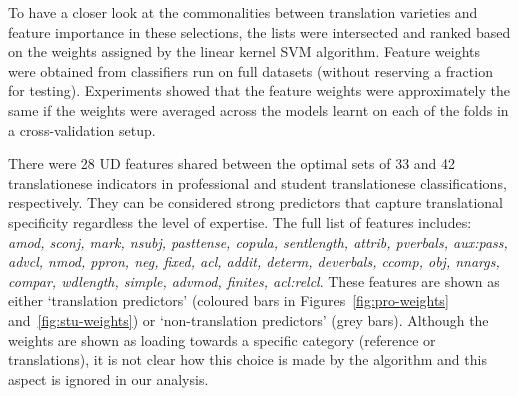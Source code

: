 To have a closer look at the commonalities between translation varieties and feature importance in these selections, the lists were intersected and ranked based on the weights assigned by the linear kernel SVM algorithm. Feature weights were obtained from classifiers run on full datasets (without reserving a fraction for testing). Experiments showed that the feature weights were approximately the same if the weights were averaged across the models learnt on each of the folds in a cross-validation setup.

There were 28 UD features shared between the optimal sets of 33 and 42 translationese indicators in professional and student translationese classifications, respectively. They can be considered strong predictors that capture translational specificity regardless the level of expertise.
The full list of features includes: \textit{amod, sconj, mark, nsubj, pasttense, copula, sentlength, attrib, pverbals, aux:pass, advcl, nmod, ppron, neg, fixed, acl, addit, determ, deverbals, ccomp, obj, nnargs, compar, wdlength, simple, advmod, finites, acl:relcl}. 
These features are shown as either `translation predictors' (coloured bars in Figures~\ref{fig:pro-weights} and~\ref{fig:stu-weights}) or `non-translation predictors' (grey bars). Although the weights are shown as loading towards a specific category (reference or translations), it is not clear how this choice is made by the algorithm and this aspect is ignored in our analysis. 

